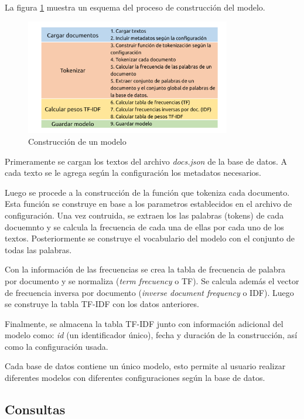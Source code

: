 La figura \ref{fig:model-build} muestra un esquema del proceso de construcción del
modelo.

\begin{figure}[htb]%
	\begin{center}
		\includegraphics[width=0.8\textwidth]{./sri_02.png}
	\end{center}
	\caption{Construcción de un modelo}
	\label{fig:model-build}
\end{figure}

Primeramente se cargan los textos del archivo \emph{docs.json} de la base de
datos. A cada texto se le agrega según la configuración los metadatos necesarios.

Luego se procede a la construcción de la función que tokeniza cada documento.
Esta función se construye en base a los parametros establecidos en el archivo
de configuración. Una vez contruida, se extraen los las palabras (tokens) de
cada docuemnto y se calcula la frecuencia de cada una de ellas por cada uno de
los textos. Posteriormente se construye el vocabulario del modelo con el
conjunto de todas las palabras.

Con la información de las frecuencias se crea la tabla de frecuencia de palabra
por documento y se normaliza (\emph{term frecuency} o TF). Se calcula además el
vector de frecuencia inversa por documento (\emph{inverse document frequency} o
IDF). Luego se construye la tabla TF-IDF con los datos anteriores.

Finalmente, se almacena la tabla TF-IDF junto con información adicional del modelo
como: \emph{id} (un identificador único), fecha y duración de la construcción, así
como la configuración usada.

Cada base de datos contiene un único modelo, esto permite al usuario realizar
diferentes modelos con diferentes configuraciones según la base de datos.

\subsection{Consultas}\label{sec:query}

